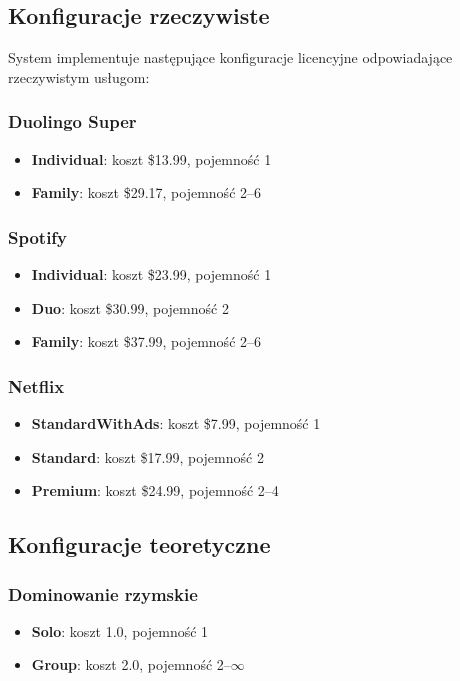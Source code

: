 \subsection{Konfiguracje rzeczywiste}

System implementuje następujące konfiguracje licencyjne odpowiadające rzeczywistym usługom:

\subsubsection{Duolingo Super}
\begin{itemize}
\item \textbf{Individual}: koszt \$13.99, pojemność 1
\item \textbf{Family}: koszt \$29.17, pojemność 2--6
\end{itemize}

\subsubsection{Spotify}
\begin{itemize}
\item \textbf{Individual}: koszt \$23.99, pojemność 1
\item \textbf{Duo}: koszt \$30.99, pojemność 2
\item \textbf{Family}: koszt \$37.99, pojemność 2--6
\end{itemize}

\subsubsection{Netflix}
\begin{itemize}
\item \textbf{StandardWithAds}: koszt \$7.99, pojemność 1
\item \textbf{Standard}: koszt \$17.99, pojemność 2
\item \textbf{Premium}: koszt \$24.99, pojemność 2--4
\end{itemize}

\subsection{Konfiguracje teoretyczne}

\subsubsection{Dominowanie rzymskie}
\begin{itemize}
\item \textbf{Solo}: koszt 1.0, pojemność 1
\item \textbf{Group}: koszt 2.0, pojemność 2--$\infty$
\end{itemize}

